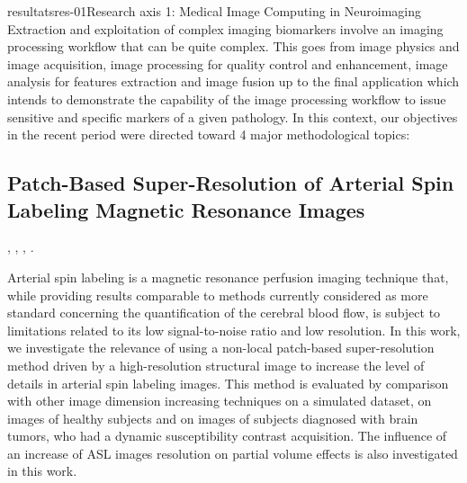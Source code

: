 \documentclass{ra2018}
\begin{document}
\begin{module}{resultats}{res-01}{Research axis 1: Medical Image Computing in Neuroimaging}
Extraction and exploitation of complex imaging biomarkers involve an imaging processing workflow that can be quite complex. This goes from image physics and image acquisition, image processing for quality control and enhancement, image analysis for features extraction and image fusion up to the final application which intends to demonstrate the capability of the image processing workflow to issue sensitive and specific markers of a given pathology. In this context, our objectives in the recent period were directed toward 4 major methodological topics:

\subsection{Patch-Based Super-Resolution of Arterial Spin Labeling Magnetic Resonance Images}
\begin{participants}
      , 
      , 
      ,
      .
\end{participants}
Arterial spin labeling is a magnetic resonance perfusion imaging technique that, while providing results comparable to methods currently considered as more standard concerning the quantification of the cerebral blood flow, is subject to limitations related to its low signal-to-noise ratio and low resolution. In this work, we investigate the relevance of using a non-local patch-based super-resolution method driven by a high-resolution structural image to increase the level of details in arterial spin labeling images. This method is evaluated by comparison with other image dimension increasing techniques on a simulated dataset, on images of healthy subjects and on images of subjects diagnosed with brain tumors, who had a dynamic susceptibility contrast acquisition. The influence of an increase of ASL images resolution on partial volume effects is also investigated in this work.~\cite{meuree:inserm-01880726}



\end{module}
\end{document}
